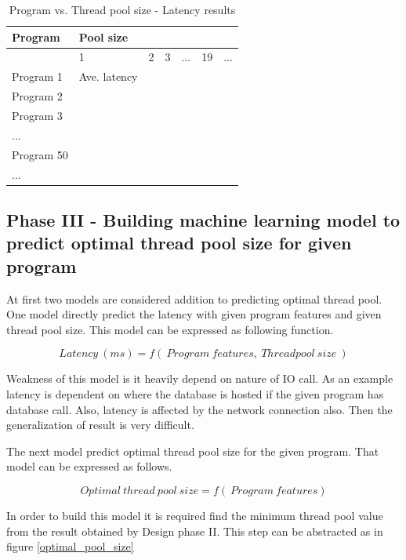 \begin{table}[]
	\begin{center}
	\begin{tabular}{|l|l|l|l|l|l|l|}
		\hline
		Program    & \multicolumn{6}{l|}{Pool size}        \\ \hline
		& 1            & 2 & 3 & ... & 19 & ... \\ \hline
		Program 1  & Ave. latency &   &   &     &    &     \\ \hline
		Program 2  &              &   &   &     &    &     \\ \hline
		Program 3  &              &   &   &     &    &     \\ \hline
		...        &              &   &   &     &    &     \\ \hline
		Program 50 &              &   &   &     &    &     \\ \hline
		...        &              &   &   &     &    &     \\ \hline
	\end{tabular}
	\end{center}
	\caption{Program vs. Thread pool size - Latency results}
	\label{tab:pool_size_latency}
\end{table}

\subsection{Phase III - Building machine learning model to predict optimal thread pool size for given program}

At first two models are considered addition to predicting optimal thread pool. One model directly predict the latency with given program features and given thread pool size. This model can be expressed as following function. 

$$ Latency \:(ms) = f(\:Program\:features,\:Threadpool\:size\:)$$

Weakness of this model is it heavily depend on nature of IO call. As an example latency is dependent on where the database is hosted if the given program has database call. Also, latency is affected by the network connection also. Then the generalization of result is very difficult.

The next model predict optimal thread pool size for the given program. That model can be expressed as follows.

$$ Optimal\:thread\:pool\:size = f(\:Program\:features)$$

In order to build this model it is required find the minimum thread pool value from the result obtained by Design phase II. This step can be abstracted as in figure \ref{optimal_pool_size}

